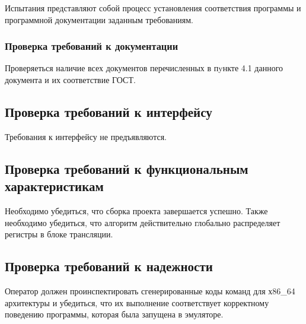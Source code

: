 Испытания представляют собой процесс установления соответствия программы и
программной документации заданным требованиям.

\subsubsection{Проверка требований к документации}
Проверяеться наличие всех документов перечисленных в пyнкте 4.1 данного документа и их соответствие ГОСТ.

\subsection{Проверка требований к интерфейсу}
Требования к интерфейсу не предъявляются.

\subsection{Проверка требований к функциональным характеристикам}
Необходимо убедиться, что сборка проекта завершается успешно. Также необходимо убедиться, что алгоритм
действительно глобально распределяет регистры в блоке трансляции.


\subsection{Проверка требований к надежности}
Оператор должен проинспектировать сгенерированные коды команд для х86\_64 архитектуры и убедиться, что их выполнение соответствует корректному поведению программы, которая была запущена в эмуляторе.
